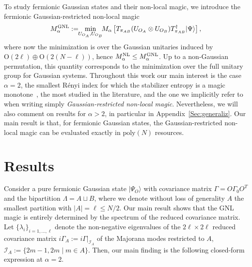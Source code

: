 \documentclass[prx,twocolumn,superscriptaddress,aps,10pt, frontmatterverbose, reprint,footinbib,longbibliography=true]{revtex4-2}
\newcommand{\RENYI}{\alpha}
\begin{document}
To study fermionic Gaussian states and their non-local magic, we introduce the fermionic Gaussian-restricted non-local magic
\begin{equation}
    M_\RENYI^\textup{GNL}:= \!\!\min_{U_{O_A} , U_{O_B}} \!\!M_\RENYI\left[T_{\pi_{AB}} (U_{O_A}\otimes U_{O_B})T_{\pi_{AB}}^\dagger|\Psi\rangle\right],\label{eq:defGNLmagic}
\end{equation}
where now the minimization is over the Gaussian unitaries induced by $\mathrm{O}(2\ell)\oplus \mathrm{O}(2(N-\ell))$, hence $ M_\RENYI^\textup{NL} \leq  M_\RENYI^\textup{GNL}$. Up to a non-Gaussian permutation, this quantity corresponds to the minimization over the full unitary group for Gaussian systems.
Throughout this work our main interest is the case $\RENYI=2$, the smallest R\'enyi index for which the stabilizer entropy is a magic monotone~\cite{piro,leone2024stabilizer}, the most studied in the literature, and the one we implicitly refer to when writing simply \emph{Gaussian-restricted non-local magic}. Nevertheless, we will also comment on results for $\RENYI>2$, in particular in Appendix~\ref{Sec:generaliz}.
Our main result is that, for fermionic Gaussian states, the Gaussian-restricted non-local magic can be evaluated exactly in $\mathrm{poly}(N)$ resources.

\section{Results}
Consider a pure fermionic Gaussian state $|\Psi_O\rangle$ with covariance matrix $\Gamma=O \Gamma_0 O^T$ and the bipartition $\Lambda = A\sqcup B$, where we denote without loss of generality $A$ the smallest partition with $|A|=\ell\le N/2$. 
Our main result shows that the GNL magic is entirely determined by the spectrum of the reduced covariance matrix. Let $\{\lambda_i\}_{i=1,\dots,\ell}$ denote the non-negative eigenvalues of the $2\ell\times 2\ell$ reduced covariance matrix $i\Gamma_A := i\Gamma|_{\mathcal{I}_A}$ of the Majorana modes restricted to $A$, $\mathcal{I}_A:=\{2m-1,2m\;|\; m\in A\}$. Then, our main finding is the following closed-form expression at $\RENYI=2$.
\end{document}
